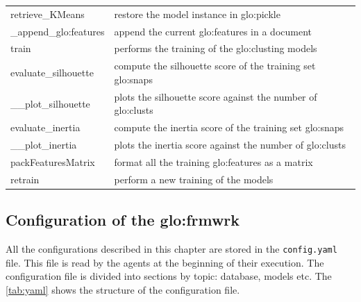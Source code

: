 \begin{longtable}{p{}p{}}
    retrieve\_KMeans & restore the model instance in \gls{glo:pickle}  \\
    \_append\_\gls{glo:feature}s & append the current \gls{glo:feature}s in a document \\
    train & performs the training of the \gls{glo:clust}ing models \\
    evaluate\_silhouette & compute the silhouette score of the training set \gls{glo:snap}s \\
    \_\_plot\_silhouette & plots the silhouette score against the number of \gls{glo:clust}s \\
    evaluate\_inertia & compute the inertia score of the training set \gls{glo:snap}s \\
    \_\_plot\_inertia & plots the inertia score against the number of \gls{glo:clust}s \\
    packFeaturesMatrix & format all the training \gls{glo:feature}s as a matrix \\
    retrain & perform a new training of the models \\
    \bottomrule
    \end{longtable}
    
\newpage
\subsection{Configuration of the \gls{glo:frmwrk}}
All the configurations described in this chapter are stored in the \texttt{config.yaml} file. This file is read by the agents at the beginning of their execution. The configuration file is divided into sections by topic: database, models etc. The \autoref{tab:yaml} shows the structure of the configuration file.


